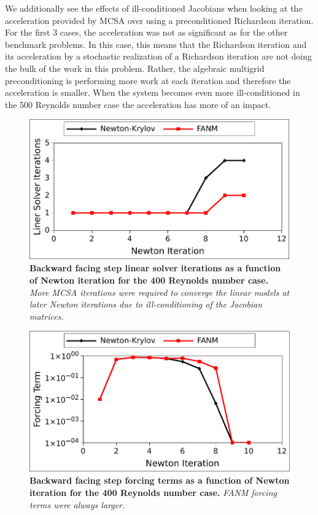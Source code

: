 We additionally see the effects of ill-conditioned Jacobians when
looking at the acceleration provided by MCSA over using a
preconditioned Richardson iteration. For the first 3 cases, the
acceleration was not as significant as for the other benchmark
problems. In this case, this means that the Richardson iteration and
its acceleration by a stochastic realization of a Richardson iteration
are not doing the bulk of the work in this problem. Rather, the
algebraic multigrid preconditioning is performing more work at each
iteration and therefore the acceleration is smaller. When the system
becomes even more ill-conditioned in the 500 Reynolds number case
the acceleration has more of an impact.

\begin{figure}[t!]
  \begin{center}
    \includegraphics[width=6in]{chapters/nonlinear_problem/step_re400_iters.pdf}
  \end{center}
  \caption{\textbf{Backward facing step linear solver iterations as a
      function of Newton iteration for the 400 Reynolds number case.}
    \textit{More MCSA iterations were required to converge the linear
      models at later Newton iterations due to ill-conditioning of the
      Jacobian matrices.}}
  \label{fig:step_re400_iters}
\end{figure}

\begin{figure}[t!]
  \begin{center}
    \includegraphics[width=6in]{chapters/nonlinear_problem/step_re400_forcing.pdf}
  \end{center}
  \caption{\textbf{Backward facing step forcing terms as a function of
      Newton iteration for the 400 Reynolds number case.} \textit{FANM
      forcing terms were always larger.}}
  \label{fig:step_re400_forcing}
\end{figure}

